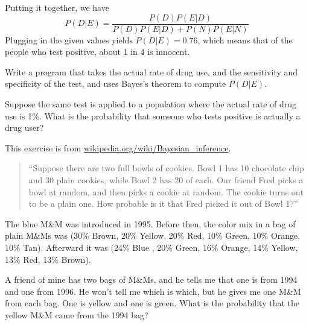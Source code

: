 \documentclass[12pt]{book}
\begin{document}

Putting it together, we have
%
\[ P(D|E) = \frac{P(D) P(E|D)}{P(D) P(E|D) + P(N) P(E|N)}\]
%
Plugging in the given values yields $P(D|E) = 0.76$, which means
that of the people who test positive, about 1 in 4 is innocent. 

\begin{exercise}
Write a program that takes the actual rate of drug use, and the
sensitivity and specificity of the test, and uses Bayes's theorem
to compute $P(D|E)$.

Suppose the same test is applied to a population where the actual
rate of drug use is 1\%.  What is the probability that someone
who tests positive is actually a drug user?

\end{exercise}


\begin{exercise}
This exercise is from \url{wikipedia.org/wiki/Bayesian_inference}.

\begin{quote}

``Suppose there are two full bowls of cookies. Bowl 1 has 10 chocolate
  chip and 30 plain cookies, while Bowl 2 has 20 of each. Our friend
  Fred picks a bowl at random, and then picks a cookie at random. The
  cookie turns out to be a plain one. How probable is it that Fred
  picked it out of Bowl 1?''

\end{quote}


\end{exercise}

\begin{exercise}

The blue M\&M was introduced in 1995.  Before then, the color mix in
a bag of plain M\&Ms was (30\% Brown, 20\% Yellow, 20\% Red, 10\%
Green, 10\% Orange, 10\% Tan).  Afterward it was (24\% Blue , 20\%
Green, 16\% Orange, 14\% Yellow, 13\% Red, 13\% Brown).


A friend of mine has two bags of M\&Ms, and he tells me
that one is from 1994 and one from 1996.  He won't tell me which is
which, but he gives me one M\&M from each bag.  One is yellow and
one is green.  What is the probability that the yellow M\&M came
from the 1994 bag?
  
\end{exercise}
\end{document}
